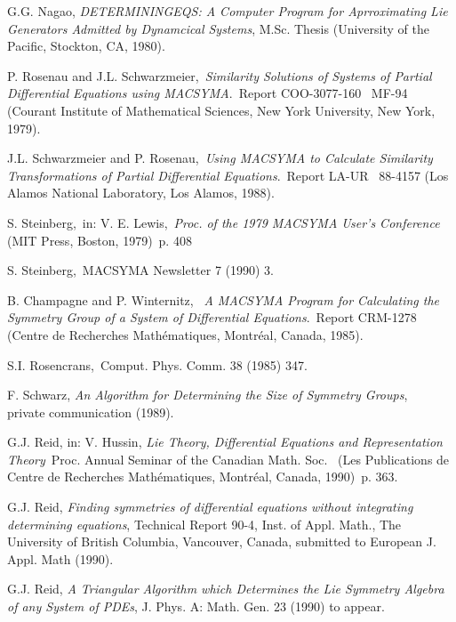 {\begin{thebibliography}{99}
 {\sc G.G. Nagao}, 
{\em DETERMININGEQS: A Computer Program for Aprroximating Lie Generators 
Admitted by Dynamcical Systems}, 
M.Sc. Thesis (University of the Pacific, Stockton, CA, 1980).

 {\sc P. Rosenau} and 
{\sc J.L. Schwarzmeier},\, {\em Similarity Solutions of Systems of
Partial Differential Equations using MACSYMA}.\, 
Report COO-3077-160 \, MF-94 (Courant Institute of
Mathematical Sciences, New York University, New York, 1979).

 {\sc J.L. Schwarzmeier} and
{\sc P. Rosenau},\,
{\em Using MACSYMA to Calculate Similarity Transformations of Partial
Differential Equations}.\, Report LA-UR \, 88-4157 (Los Alamos 
National Laboratory, Los Alamos, 1988).

 {\sc S. Steinberg},\,
in: V. E. Lewis,\, {\em Proc. of the 1979 MACSYMA User's Conference} \, 
(MIT Press, Boston, 1979)\, p. 408

 {\sc S. Steinberg},\,
MACSYMA Newsletter 7 (1990) 3. 

 {\sc B. Champagne} and {\sc P. Winternitz}, \,
{\em A MACSYMA Program for Calculating the Symmetry Group of a System
of Differential Equations}.\, Report CRM-1278 (Centre de Recherches 
Math\'{e}matiques, Montr\'{e}al, Canada, 1985).

 {\sc S.I. Rosencrans},\,
Comput. Phys. Comm. 38 (1985) 347.

 {\sc F. Schwarz}, 
{\em An Algorithm for Determining the Size of Symmetry Groups}, \,
private communication (1989).

 {\sc G.J. Reid}, in: V. Hussin,
{\em Lie Theory, Differential Equations and Representation Theory}\,
Proc. Annual Seminar of the Canadian Math. Soc. \,
(Les Publications de Centre de Recherches Math\'{e}matiques, Montr\'{e}al, 
Canada, 1990)\, p. 363.

 {\sc G.J. Reid},
{\em Finding symmetries of differential equations without integrating
determining equations}, Technical Report 90-4, Inst. of Appl. Math.,
The University of British Columbia, Vancouver, Canada, submitted to 
European J. Appl. Math (1990).

 {\sc G.J. Reid},
{\em A Triangular Algorithm which Determines the Lie Symmetry Algebra of any
System of PDEs}, J. Phys. A: Math. Gen. 23 (1990) to appear.


\end{thebibliography}}
